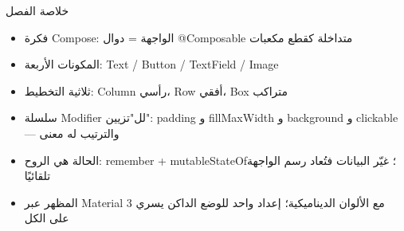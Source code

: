 \begin{tcbsummary}{خلاصة الفصل}
\begin{itemize}
  \item فكرة Compose: الواجهة = دوال @Composable متداخلة كقطع مكعبات
  \item المكونات الأربعة: Text / Button / TextField / Image
  \item ثلاثية التخطيط: Column رأسي، Row أفقي، Box متراكب
  \item سلسلة Modifier لل"تزيين": padding و fillMaxWidth و background و clickable — والترتيب له معنى
  \item الحالة هي الروح: remember + mutableStateOf؛ غيّر البيانات فتُعاد رسم الواجهة تلقائيًا
  \item المظهر عبر Material 3 مع الألوان الديناميكية؛ إعداد واحد للوضع الداكن يسري على الكل
\end{itemize}

\end{tcbsummary}

